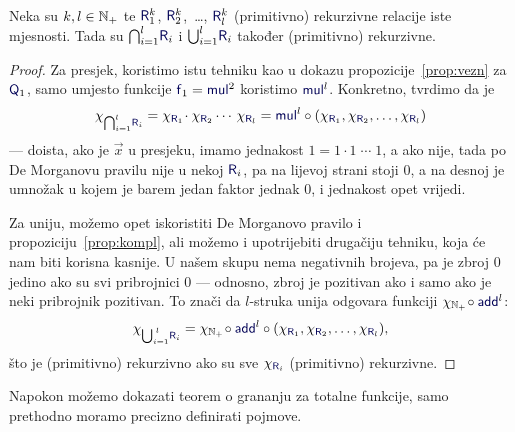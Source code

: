 \begin{propozicija}[{name=[višestruke unije i presjeci čuvaju (primitivnu) rekurzivnost]}]\label{prop:skupl}
Neka su $k,l\in{\mathbb N}_+$ te $\f R_1^k$, $\f R_2^k$,~\ldots, $\f R_l^k$ (primitivno) rekurzivne relacije iste mjesnosti. Tada su $\bigcap_{i=1}^l\!\f R_i$ i $\bigcup_{i=1}^l\!\f R_i$ također (primitivno) rekurzivne.
\end{propozicija}
\begin{proof}
Za presjek, koristimo istu tehniku kao u dokazu propozicije~\ref{prop:vezn} za $\f Q_1$, samo umjesto funkcije $\f f_1=\f{mul}^2$ koristimo $\f{mul}^l$. Konkretno, tvrdimo da je \begin{equation}
    \chi_{\bigcap_{i=1}^l\!\f R_i}=\chi_{\f R_1}\!\cdot\chi_{\f R_2}\dotsb\,\chi_{\f R_l}=\f{mul}^l\circ(\chi_{\f R_1},\chi_{\f R_2},\dotsc,\chi_{\f R_l})
\end{equation}
    --- doista, ako je $\vec x$ u presjeku, imamo jednakost $1=1\cdot1\mathbin{\dotsb}1$, a ako nije, tada po De Morganovu pravilu nije u nekoj $\f{R}_i$, pa na lijevoj strani stoji $0$, a na desnoj je umnožak u kojem je barem jedan faktor jednak $0$, i jednakost opet vrijedi.

Za uniju, možemo opet iskoristiti De Morganovo pravilo i propoziciju~\ref{prop:kompl}, ali možemo i upotrijebiti drugačiju tehniku, koja će nam biti korisna kasnije. U našem skupu nema negativnih brojeva, pa je zbroj $0$ jedino ako su svi pribrojnici $0$ --- odnosno, zbroj je pozitivan ako i samo ako je neki pribrojnik pozitivan. To znači da %
    $l$-struka unija odgovara funkciji $\chi_{\N_+}\!\circ\f{add}^l$:
\begin{equation}
\label{eq:unk}
	\chi_{\bigcup_{i=1}^{\;l}\!\f R_i}=\chi_{\N_+}\!\circ\f{add}^l\circ(\chi_{\f R_1},\chi_{\f R_2},\dotsc,\chi_{\f R_l})\text,
\end{equation}
što je (primitivno) rekurzivno ako su sve $\chi_{\f R_i}$ (primitivno) rekurzivne.
\end{proof}


Napokon možemo dokazati teorem o grananju za totalne funkcije, samo prethodno moramo precizno definirati pojmove.

